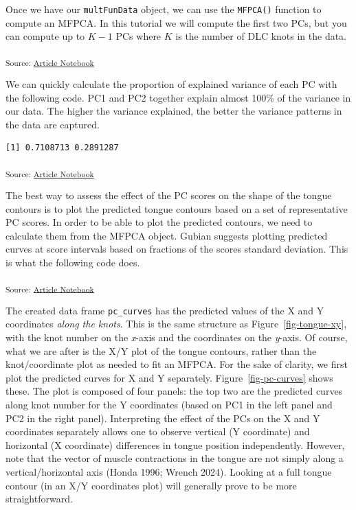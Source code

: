 \documentclass[
]{interact}
\begin{document}
Once we have our \texttt{multFunData} object, we can use the
\texttt{MFPCA()} function to compute an MFPCA. In this tutorial we will
compute the first two PCs, but you can compute up to \(K-1\) PCs where
\(K\) is the number of DLC knots in the data.

\textsubscript{Source:
\href{https://stefanocoretta.github.io/mv_uti/index.qmd.html}{Article
Notebook}}

We can quickly calculate the proportion of explained variance of each PC
with the following code. PC1 and PC2 together explain almost 100\% of
the variance in our data. The higher the variance explained, the better
the variance patterns in the data are captured.

\begin{verbatim}
[1] 0.7108713 0.2891287
\end{verbatim}

\textsubscript{Source:
\href{https://stefanocoretta.github.io/mv_uti/index.qmd.html}{Article
Notebook}}

The best way to assess the effect of the PC scores on the shape of the
tongue contours is to plot the predicted tongue contours based on a set
of representative PC scores. In order to be able to plot the predicted
contours, we need to calculate them from the MFPCA object. Gubian
suggests plotting predicted curves at score intervals based on fractions
of the scores standard deviation. This is what the following code does.

\textsubscript{Source:
\href{https://stefanocoretta.github.io/mv_uti/index.qmd.html}{Article
Notebook}}

The created data frame \texttt{pc\_curves} has the predicted values of
the X and Y coordinates \emph{along the knots}. This is the same
structure as Figure~\ref{fig-tongue-xy}, with the knot number on the
\emph{x}-axis and the coordinates on the \emph{y}-axis. Of course, what
we are after is the X/Y plot of the tongue contours, rather than the
knot/coordinate plot as needed to fit an MFPCA. For the sake of clarity,
we first plot the predicted curves for X and Y separately.
Figure~\ref{fig-pc-curves} shows these. The plot is composed of four
panels: the top two are the predicted curves along knot number for the Y
coordinates (based on PC1 in the left panel and PC2 in the right panel).
Interpreting the effect of the PCs on the X and Y coordinates separately
allows one to observe vertical (Y coordinate) and horizontal (X
coordinate) differences in tongue position independently. However, note
that the vector of muscle contractions in the tongue are not simply
along a vertical/horizontal axis (Honda 1996; Wrench 2024). Looking at a
full tongue contour (in an X/Y coordinates plot) will generally prove to
be more straightforward.
\end{document}
